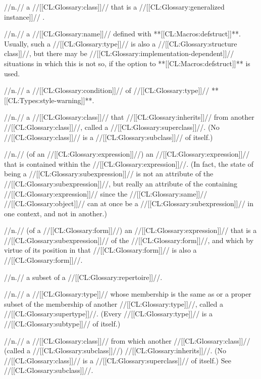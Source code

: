  //n.// a //[[CL:Glossary:class]]// that is a //[[CL:Glossary:generalized instance]]// .

 //n.// a //[[CL:Glossary:name]]// defined with **[[CL:Macros:defstruct]]**. Usually, such a //[[CL:Glossary:type]]// is also a //[[CL:Glossary:structure class]]//, but there may be //[[CL:Glossary:implementation-dependent]]// situations in which this is not so, if the  option to **[[CL:Macros:defstruct]]** is used.

 //n.// a //[[CL:Glossary:condition]]// of //[[CL:Glossary:type]]// **[[CL:Types:style-warning]]**.

 //n.// a //[[CL:Glossary:class]]// that //[[CL:Glossary:inherits]]// from another //[[CL:Glossary:class]]//, called a //[[CL:Glossary:superclass]]//. (No //[[CL:Glossary:class]]// is a //[[CL:Glossary:subclass]]// of itself.)
 
 //n.// (of an //[[CL:Glossary:expression]]//) an //[[CL:Glossary:expression]]// that is contained within the //[[CL:Glossary:expression]]//. (In fact, the state of being a //[[CL:Glossary:subexpression]]// is not an attribute of the //[[CL:Glossary:subexpression]]//, but really an attribute of the containing //[[CL:Glossary:expression]]// since the //[[CL:Glossary:same]]// //[[CL:Glossary:object]]// can at once be a //[[CL:Glossary:subexpression]]// in one context, and not in another.)

 //n.// (of a //[[CL:Glossary:form]]//) an //[[CL:Glossary:expression]]// that is a //[[CL:Glossary:subexpression]]// of the //[[CL:Glossary:form]]//, and which by virtue of its position in that //[[CL:Glossary:form]]// is also a //[[CL:Glossary:form]]//. 

 //n.// a subset of a //[[CL:Glossary:repertoire]]//.

 //n.// a //[[CL:Glossary:type]]// whose membership is the same as or a proper subset of the membership of another //[[CL:Glossary:type]]//, called a //[[CL:Glossary:supertype]]//. (Every //[[CL:Glossary:type]]// is a //[[CL:Glossary:subtype]]// of itself.)
 
 //n.// a //[[CL:Glossary:class]]// from which another //[[CL:Glossary:class]]// (called a //[[CL:Glossary:subclass]]//) //[[CL:Glossary:inherits]]//. (No //[[CL:Glossary:class]]// is a //[[CL:Glossary:superclass]]// of itself.) See //[[CL:Glossary:subclass]]//.
 
